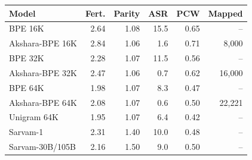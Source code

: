 \begin{tabular}{@{}lrrrrr@{}}
\toprule
Model & Fert. & Parity & ASR & PCW & Mapped \\
\midrule
BPE 16K & 2.64 & 1.08 & 15.5 & 0.65 & -- \\
Akshara-BPE 16K & 2.84 & 1.06 & 1.6 & 0.71 & 8,000 \\
BPE 32K & 2.28 & 1.07 & 11.5 & 0.56 & -- \\
Akshara-BPE 32K & 2.47 & 1.06 & 0.7 & 0.62 & 16,000 \\
BPE 64K & 1.98 & 1.07 & 8.3 & 0.47 & -- \\
Akshara-BPE 64K & 2.08 & 1.07 & 0.6 & 0.50 & 22,221 \\
Unigram 64K & 1.95 & 1.07 & 6.4 & 0.42 & -- \\
\midrule
Sarvam-1 & 2.31 & 1.40 & 10.0 & 0.48 & -- \\
Sarvam-30B/105B & 2.16 & 1.50 & 9.0 & 0.50 & -- \\
\bottomrule
\end{tabular}
